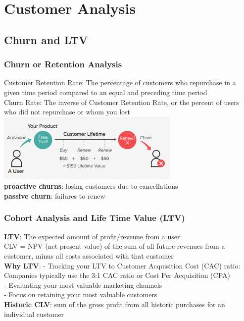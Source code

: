 \documentclass{beamer}
\begin{document}








\section{Customer Analysis}
\subsection{Churn and LTV}

\begin{frame}\frametitle{Churn or Retention Analysis}
Customer Retention Rate: The percentage of customers who repurchase in a given time period compared to an equal and preceding time period\\
Churn Rate: The inverse of Customer Retention Rate, or the percent of users who did not repurchase or whom you lost\\

\includegraphics[scale=0.5]{churn}\\
\textbf{proactive churns}: losing customers due to cancellations\\ \textbf{passive churn}: failures to renew\\
\end{frame}


\begin{frame}\frametitle{Cohort Analysis and Life Time Value (LTV)}
	\textbf{LTV}: The expected amount of profit/revenue from a user\\
	CLV = NPV (net present value) of the sum of all future revenues from a customer, minus all costs associated with that customer\\
	\textbf{Why LTV}:
	- Tracking your LTV to Customer Acquisition Cost (CAC) ratio: Companies typically use the 3:1 CAC ratio or Cost Per Acquisition (CPA)\\
	- Evaluating your most valuable marketing channels\\
	- Focus on retaining your most valuable customers\\
	\textbf{Historic CLV}: sum of the gross profit from all historic purchases for an individual customer

	
\end{frame}
\end{document}
